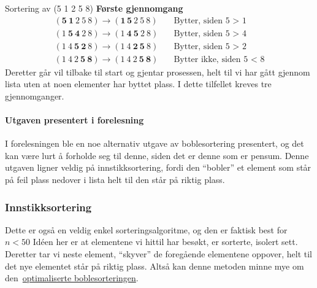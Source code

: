 \begin{eks} Sortering av (5 1 2 5 8) \newline
  \textbf{Første gjennomgang}
  \begin{align*}
    (\mathbf{5}~ \mathbf{1}~ 2~ 5~ 8) \rightarrow (\mathbf{1}\, \mathbf{5} ~ 2 ~ 5 ~ 8) &\quad \text{Bytter, siden 5 > 1} \\
    (1~ \mathbf{5}~ \mathbf{4}~ 2~ 8) \rightarrow (1 ~ \mathbf{4} ~ \mathbf{5} ~ 2 ~ 8) &\quad \text{Bytter, siden 5 > 4} \\
    (1~ 4~ \mathbf{5}~ \mathbf{2}~ 8) \rightarrow (1~ 4~ \mathbf{2}~ \mathbf{5}~ 8)     &\quad \text{Bytter, siden 5 > 2} \\
    (1~ 4~ 2~ \mathbf{5}~ \mathbf{8}) \rightarrow (1~ 4~ 2~ \mathbf{5}~ \mathbf{8})     &\quad \text{Bytter ikke, siden 5 < 8}
  \end{align*}
  Deretter går vil tilbake til start og gjentar prosessen, helt til vi har gått gjennom lista uten at noen elementer har byttet plass.
  I dette tilfellet kreves tre gjennomganger.
\end{eks}


\paragraph*{Utgaven presentert i forelesning}\label{sec:bubbleoptimal}
I forelesningen ble en noe alternativ utgave av boblesortering presentert, og det kan være lurt å forholde seg til denne, siden det er denne som er pensum.
Denne utgaven ligner veldig på innstikksortering, fordi den ``bobler'' et element som står på feil plass nedover i lista helt til den står på riktig plass.




\subsubsection{\color{red}Innstikksortering}\label{insertsort}
Dette er også en veldig enkel sorteringsalgoritme, og den er faktisk best for $n<50$
Idéen her er at elementene vi hittil har besøkt, er sorterte, isolert sett.
Deretter tar vi neste element, ``skyver'' de foregående elementene oppover,
helt til det nye elementet står på riktig plass.
Altså kan denne metoden minne mye om den~\hyperref[sec:bubbleoptimal]{optimaliserte boblesorteringen}. 


